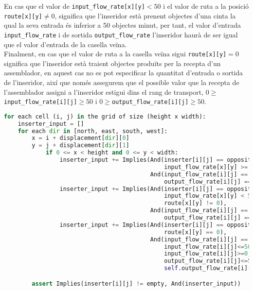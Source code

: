 En cas que el valor de \texttt{input\_flow\_rate[x][y]$<50$} i el valor de ruta a la posició \texttt{route[x][y]$\neq0$}, significa que l'inseridor està prenent objectes d'una cinta la qual la seva entrada és inferior a 50 objectes minut, per tant, el valor d'entrada \texttt{input\_flow\_rate} i de sortida \texttt{output\_flow\_rate} l'inseridor haurà de ser igual que el valor d'entrada de la casella veïna.\\

Finalment, en cas que el valor de ruta a la casella veïna sigui \texttt{route[x][y]$=0$} significa que l'inseridor està traient objectes produïts per la recepta d'un assemblador, en aquest cas no es pot especificar la quantitat d'entrada o sortida de l'inseridor, així que només assegurem que el possible valor que la recepta de l'assemblador assigni a l'inseridor estigui dins el rang de transport, $0\ge$\texttt{input\_flow\_rate[i][j]}$\ge50$ i $0\ge$\texttt{output\_flow\_rate[i][j]}$\ge50$.

\begin{lstlisting}[language=Python, caption=Inserter Item Flow Propagation]
for each cell (i, j) in the grid of size (height x width):
    inserter_input = []
    for each dir in [north, east, south, west]:
        x = i + displacement[dir][0]
        y = j + displacement[dir][1]
            if 0 <= x < height and 0 <= y < width:
                inserter_input += Implies(And(inserter[i][j] == opposite(dir),
                                              input_flow_rate[x][y] >= 50),
                                          And(input_flow_rate[i][j] == 50,
                                              output_flow_rate[i][j] == 50))
                inserter_input += Implies(And(inserter[i][j] == opposite(dir),
                                              input_flow_rate[x][y] < 50,
                                              route[x][y] != 0),
                                          And(input_flow_rate[i][j] == input_flow_rate[x][y],
                                              output_flow_rate[i][j] == input_flow_rate[x][y]))
                inserter_input += Implies(And(inserter[i][j] == opposite(dir),
                                              route[x][y] == 0),
                                          And(input_flow_rate[i][j] == output_flow_rate[i][j],
                                              input_flow_rate[i][j]<=50,
                                              input_flow_rate[i][j]>=0,
                                              output_flow_rate[i][j]<=50,
                                              self.output_flow_rate[i][j]>=0))

        assert Implies(inserter[i][j] != empty, And(inserter_input))
\end{lstlisting}


